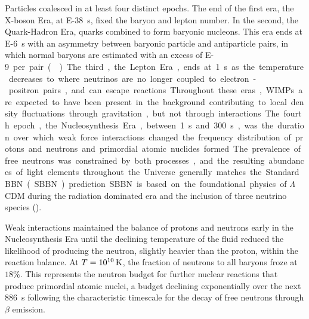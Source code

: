 \documentclass{paper}
\begin{document}

  Particles coalesced in at least four distinct epochs. The end of the first era,
  the X-boson Era, at \SI{E-38}{s}, fixed the baryon and lepton number. 
  In the second, the Quark-Hadron Era, quarks combined to form baryonic 
  nucleons. This era ends at \SI{E-6}{s} with an asymmetry between baryonic
  particle and antiparticle pairs, in which normal baryons are estimated with an 
  excess of \SI{E-9} per pair (\cite{1993PhRvL..70.2833F}). The third, the 
  Lepton Era, ends at \SI{1}{s} as the temperature decreases to 
  where neutrinos are no longer coupled to electron-positron pairs, and can 
  escape reactions. Throughout these eras, WIMPs are expected to have been 
  present in the background contributing to local density fluctuations 
  through gravitation, but not through interactions.

  The fourth epoch, the Nucleosynthesis Era, between \SI{1}{s} and 
  \SI{300}{s}, was the duration over which weak force interactions changed
  the frequency distribution of protons and neutrons and primordial atomic 
  nuclides formed. The prevalence of free neutrons was constrained by both
  processes, and the resulting abundances of light elements throughout the 
  Universe generally matches the Standard BBN (SBBN)
  prediction. SBBN is based on the foundational physics of $\Lambda$CDM 
  during the radiation dominated era and the inclusion of three neutrino 
  species (\cite{Cyburt_2016}). 

  Weak interactions maintained the balance of protons and neutrons early in
  the Nucleosynthesis Era until the declining temperature of the fluid reduced 
  the likelihood of producing the neutron, slightly heavier than the proton, 
  within the reaction balance. At \(T = \SI{E10}{K}\), the fraction of 
  neutrons to all baryons froze at \(18\%\). This represents the neutron 
  budget for further nuclear reactions that produce primordial atomic nuclei, a budget
  declining exponentially over the next \SI{886}{s} following the 
  characteristic timescale for the decay of free neutrons through \(\beta\)
  emission.
\end{document}
